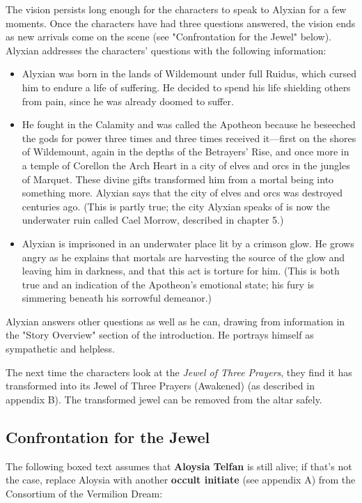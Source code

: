 \documentclass[10pt,a4paper,twoside,fancy,bg=print,twocolumn,openany,nodeprecatedcode]{dndbook}
\begin{document}
The vision persists long enough for the characters to speak to Alyxian for a few moments. Once the characters have had three questions answered, the vision ends as new arrivals come on the scene (see "Confrontation for the Jewel" below). Alyxian addresses the characters' questions with the following information:


\begin{itemize}
\item Alyxian was born in the lands of Wildemount under full Ruidus, which cursed him to endure a life of suffering. He decided to spend his life shielding others from pain, since he was already doomed to suffer.
\item He fought in the Calamity and was called the Apotheon because he beseeched the gods for power three times and three times received it—first on the shores of Wildemount, again in the depths of the Betrayers' Rise, and once more in a temple of Corellon the Arch Heart in a city of elves and orcs in the jungles of Marquet. These divine gifts transformed him from a mortal being into something more. Alyxian says that the city of elves and orcs was destroyed centuries ago. (This is partly true; the city Alyxian speaks of is now the underwater ruin called Cael Morrow, described in chapter 5.)
\item Alyxian is imprisoned in an underwater place lit by a crimson glow. He grows angry as he explains that mortals are harvesting the source of the glow and leaving him in darkness, and that this act is torture for him. (This is both true and an indication of the Apotheon's emotional state; his fury is simmering beneath his sorrowful demeanor.)
\end{itemize}

Alyxian answers other questions as well as he can, drawing from information in the "Story Overview" section of the introduction. He portrays himself as sympathetic and helpless.

The next time the characters look at the \textit{Jewel of Three Prayers}, they find it has transformed into its Jewel of Three Prayers (Awakened) (as described in appendix B). The transformed jewel can be removed from the altar safely.

\subsection{Confrontation for the Jewel}
The following boxed text assumes that \textbf{Aloysia Telfan} is still alive; if that's not the case, replace Aloysia with another \textbf{occult initiate} (see appendix A) from the Consortium of the Vermilion Dream:
\end{document}
